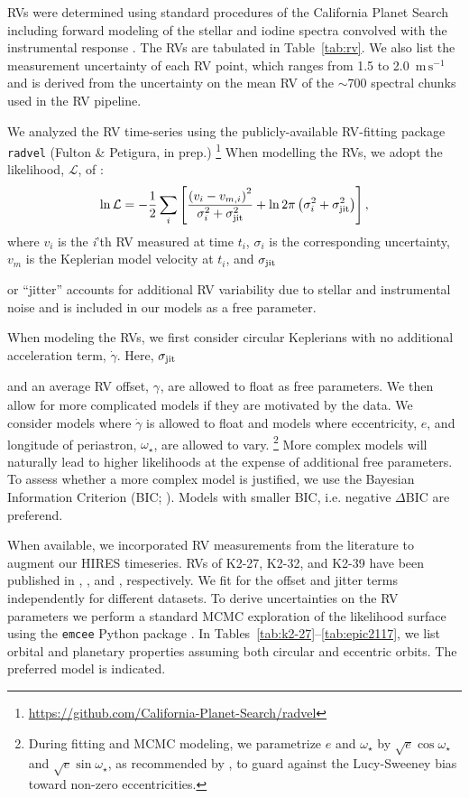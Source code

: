 \documentclass[preprint2]{aastex6}
\newcommand{\ms}{\ensuremath{\mathrm{m}\,\mathrm{s}^{-1}}\xspace}
\newcommand{\lonperi}{\ensuremath{\omega_{\star}}\xspace}
\newcommand{\sqrtecosw}{\ensuremath{\sqrt{e} \cos \lonperi}\xspace}
\newcommand{\sqrtesinw}{\ensuremath{\sqrt{e} \sin \lonperi}\xspace}
\newcommand{\dvdt}{\ensuremath{\dot{\gamma}}\xspace}
\newcommand{\sigjit}[1]{
        \ensuremath{
                \ifthenelse{\equal{#1}{}}{\sigma_\mathrm{jit}}{\sigma_\mathrm{jit,#1}}}
        \xspace
}
\newcommand{\gam}[1]{\ensuremath{\gamma_\mathrm{#1}}\xspace}
\newcommand{\dbic}{\ensuremath{\Delta\mathrm{BIC}}\xspace}
\begin{document}
RVs were determined using standard procedures of the California Planet Search \citep[CPS;][]{howard:2010b} including forward modeling of the stellar and iodine spectra convolved with the instrumental response \citep{Marcy92,Valenti95}. The RVs are tabulated in Table~\ref{tab:rv}. We also list the measurement uncertainty of each RV point, which ranges from 1.5 to 2.0~\ms and is derived from the uncertainty on the mean RV of the $\sim$700 spectral chunks used in the RV pipeline. 

We analyzed the RV time-series using the publicly-available RV-fitting package \texttt{radvel} (Fulton \& Petigura, in prep.)%
\footnote{\url{https://github.com/California-Planet-Search/radvel}}
%
When modelling the RVs, we adopt the likelihood, $\mathcal{L}$, of \citet{Howard14}:
\[
    \ln{\mathcal{L}} = 
        - \frac{1}{2}\sum_{i} 
        \left[
            \frac{\left(v_i-v_{m,i}\right)^2}{\sigma_i^2+ \sigjit{}^2}
            + \ln{2\pi\left(\sigma_i^2 + \sigjit{}^2\right)}
        \right],
\]
where $v_i$ is the \textit{i}'th RV measured at time $t_i$, $\sigma_i$ is the corresponding uncertainty, $v_m$ is the Keplerian model velocity at $t_i$, and \sigjit{} or ``jitter'' accounts for additional RV variability due to stellar and instrumental noise and is included in our models as a free parameter. 

When modeling the RVs, we first consider circular Keplerians with no additional acceleration term, \dvdt. Here, \sigjit{} and an average RV offset, \gam{}, are allowed to float as free parameters. We then allow for more complicated models if they are motivated by the data. We consider models where  \dvdt is allowed to float and models where eccentricity, $e$, and longitude of periastron, \lonperi, are allowed to vary.%
\footnote{
During fitting and MCMC modeling, we parametrize $e$ and \lonperi by \sqrtecosw and \sqrtesinw, as recommended by \cite{Eastman13}, to guard against the Lucy-Sweeney bias toward non-zero eccentricities.
}
More complex models will naturally lead to higher likelihoods at the expense of additional free parameters. To assess whether a more complex model is justified, we use the Bayesian Information Criterion (BIC; \citealt{Schwartz78}). Models with smaller BIC, i.e. negative \dbic are preferend.  

When available, we incorporated RV measurements from the literature to augment our HIRES timeseries. RVs of K2-27, K2-32, and K2-39 have been published in \cite{VanEylen16a}, \cite{Dai16}, and \cite{VanEylen16b}, respectively.  We fit for the offset and jitter terms independently for different datasets. To derive uncertainties on the RV parameters we perform a standard MCMC exploration of the likelihood surface using the {\tt emcee} Python package \citep{Goodman10,Foreman-Mackey13}. In Tables~\ref{tab:k2-27}--\ref{tab:epic2117}, we list orbital and planetary properties assuming both circular and eccentric orbits. The preferred model is indicated.
\end{document}

